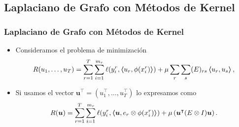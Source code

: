 \documentclass{beamer}
\newcommand{\myvec}[1]{\bm{#1}}
\newcommand{\fv}[1]{\myvec{#1}}
\newcommand{\dotp}[2]{\bm{\left\langle} #1, #2 \bm{\right\rangle}}
\newcommand{\ntasks}{T}
\newcommand{\npertask}{m}
\newcommand{\lossf}{\ell}
\begin{document}
\subsection{Laplaciano de Grafo con Métodos de Kernel}

\begin{frame}
      \frametitle{Laplaciano de Grafo con Métodos de Kernel}

      \begin{itemize}
            \item Consideramos el problema de minimización
            \begin{equation}
                  \label{eq:mtl_kernel_altext_original}
                  \begin{aligned}
                       & R({u_1, \ldots, u_T}) = \sum_{r=1}^{\ntasks} \sum_{i=1}^{\npertask_r} \lossf(y_i^r, \dotp{u_r}{\phi(x_i^r)}) + \mu \sum_r \sum_s (E)_{rs} \dotp{u_r}{u_s} , \\
                  \end{aligned}
            \end{equation}
            \item Si usamos el vector $\fv{u}^\intercal = (u_1^\intercal, \ldots, u_\ntasks^\intercal)$ lo expresamos como
            \begin{equation}
                  \label{eq:mtl_kernel_altext_tensor}
                  \begin{aligned}
                          & R(\myvec{u}) = \sum_{r=1}^{\ntasks} \sum_{i=1}^{\npertask_r} \lossf(y_i^r, \dotp{\myvec{u}}{e_r \otimes \phi(x_i^r)}) + \mu \left(  \myvec{u}^\intercal (E \otimes I) \myvec{u} \right). \\
                  \end{aligned}
              \end{equation}
      \end{itemize}

\end{frame}
\end{document}
